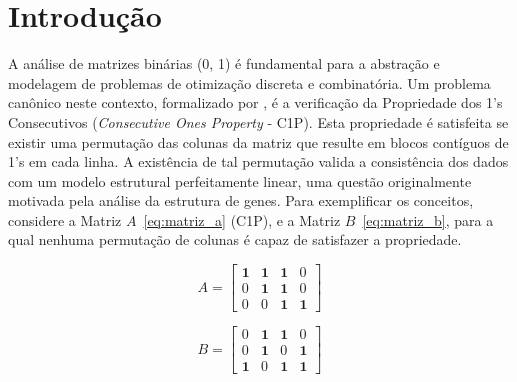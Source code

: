 \chapter{Introdução}
\label{introduction}

A análise de matrizes binárias (0, 1) é fundamental para a abstração e modelagem de problemas de otimização discreta e combinatória. Um problema canônico neste contexto, formalizado por , é a verificação da Propriedade dos 1's Consecutivos (\textit{Consecutive Ones Property} - C1P). Esta propriedade é satisfeita se existir uma permutação das colunas da matriz que resulte em blocos contíguos de 1's em cada linha. A existência de tal permutação valida a consistência dos dados com um modelo estrutural perfeitamente linear, uma questão originalmente motivada pela análise da estrutura de genes. Para exemplificar os conceitos, considere a Matriz $A$~\eqref{eq:matriz_a} (C1P), e a Matriz $B$~\eqref{eq:matriz_b}, para a qual nenhuma permutação de colunas é capaz de satisfazer a propriedade.

\begin{figure}[h!] %
    \centering
    \begin{minipage}{0.4\textwidth}
        \centering
        \begin{equation} \label{eq:matriz_a}
            A = \begin{bmatrix}
                \textbf{1} & \textbf{1} & \textbf{1} & 0          \\
                0          & \textbf{1} & \textbf{1} & 0          \\
                0          & 0          & \textbf{1} & \textbf{1}
            \end{bmatrix}
        \end{equation}
    \end{minipage}
    \begin{minipage}{0.4\textwidth}
        \centering
        \begin{equation} \label{eq:matriz_b}
            B = \begin{bmatrix}
                0          & \textbf{1} & \textbf{1} & 0          \\
                0          & \textbf{1} & 0          & \textbf{1} \\
                \textbf{1} & 0          & \textbf{1} & \textbf{1}
            \end{bmatrix}
        \end{equation}
    \end{minipage}
\end{figure}

